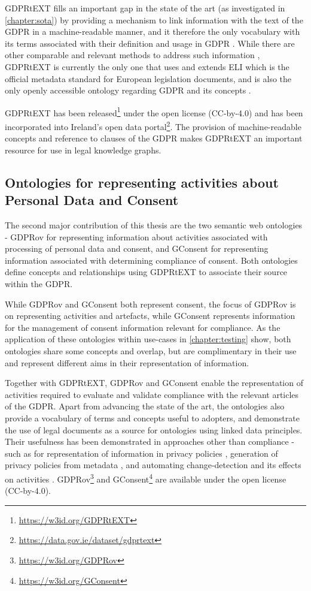 GDPRtEXT fills an important gap in the state of the art (as investigated in \autoref{chapter:sota}) by providing a mechanism to link information with the text of the GDPR in a machine-readable manner, and it therefore the only vocabulary with its terms associated with their definition and usage in GDPR .
While there are other comparable and relevant methods to address such information \cite{agarwal_legislative_2018,palmirani_pronto_2018-1}, GDPRtEXT is currently the only one  that uses and extends ELI \cite{ELI_2012} which is the official metadata standard for European legislation documents, and is also the only openly accessible ontology regarding GDPR and its concepts \cite{leone_taking_2019}.

GDPRtEXT has been released\footnote{\url{https://w3id.org/GDPRtEXT}} under the open license (CC-by-4.0) and has been incorporated into Ireland's open data portal\footnote{\url{https://data.gov.ie/dataset/gdprtext}}.
The provision of machine-readable concepts and reference to clauses of the GDPR makes GDPRtEXT an important resource for use in legal knowledge graphs.

\subsection{Ontologies for representing activities about Personal Data and Consent}\label{sec:contributions:ontologies}
The second major contribution of this thesis are the two semantic web ontologies - GDPRov for representing information about activities associated with processing of personal data and consent, and GConsent for representing information associated with determining compliance of consent. Both ontologies define concepts and relationships using GDPRtEXT to associate their source within the GDPR.

While GDPRov and GConsent both represent consent, the focus of GDPRov is on representing activities and artefacts, while GConsent represents information for the management of consent information relevant for compliance.
As the application of these ontologies within use-cases in \autoref{chapter:testing} show, both ontologies share some concepts and overlap, but are complimentary in their use and represent different aims in their representation of information.

Together with GDPRtEXT, GDPRov and GConsent enable the representation of activities required to evaluate and validate compliance with the relevant articles of the GDPR. Apart from advancing the state of the art, the ontologies also provide a vocabulary of terms and concepts useful to adopters, and demonstrate the use of legal documents as a source for ontologies using linked data principles.
Their usefulness has been demonstrated in approaches other than compliance - such as for representation of information in privacy policies \cite{pandit_ontology_2018}, generation of privacy policies from metadata \cite{pandit_personalised_2018}, and automating change-detection and its effects on activities \cite{pandit_gdpr-driven_2018}.
GDPRov\footnote{\url{https://w3id.org/GDPRov}} and GConsent\footnote{\url{https://w3id.org/GConsent}} are available under the open license (CC-by-4.0).

